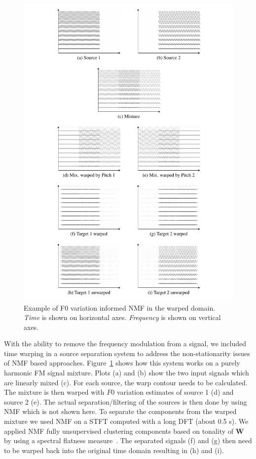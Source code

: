 \begin{figure}
  \includegraphics[width=\textwidth]{Chapters/05_Separation_Known/figures/toy.pdf}
\caption{Example of F0 variation informed NMF in the warped domain. \textit{Time} is shown on horizontal axes. \textit{Frequency} is shown on vertical axes.}%
\label{fig:warpingdemo}
\end{figure}

With the ability to remove the frequency modulation from a signal, we included time warping in a source separation system to address the non-stationarity issues of NMF based approaches. 
Figure~\ref{fig:warpingdemo} shows how this system works on a purely harmonic FM signal mixture. 
Plots (a) and (b) show the two input signals which are linearly mixed (c). 
For each source, the warp contour needs to be calculated. 
The mixture is then warped with $F0$ variation estimates of source 1 (d) and source 2 (e). 
The actual separation/filtering of the sources is then done by using NMF which is not shown here. 
To separate the components from the warped mixture we used NMF on a STFT computed with a long DFT (about 0.5 s). 
We applied NMF fully unsupervised clustering components based on tonality of $\textbf{W}$ by using a spectral flatness measure~\cite{gray74}. The separated signals (f) and (g) then need to be warped back into the original time domain resulting in (h) and (i).

